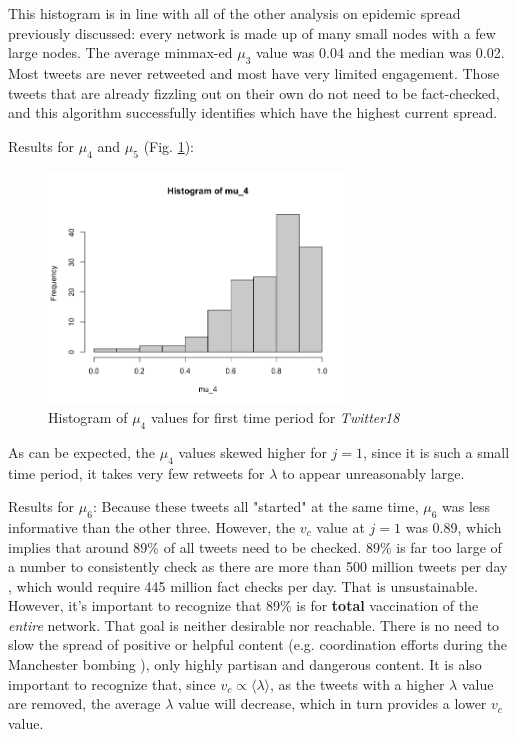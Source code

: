 \documentclass[preprint,review,12pt]{elsarticle}
\begin{document}
This histogram is in line with all of the other analysis on epidemic spread previously discussed: every network is made up of many small nodes with a few large nodes. The average minmax-ed $\mu_3$ value was 0.04 and the median was 0.02. Most tweets are never retweeted and most have very limited engagement. Those tweets that are already fizzling out on their own do not need to be fact-checked, and this algorithm successfully identifies which have the highest current spread. 

Results for $\mu_4$ and $\mu_5$ (Fig. \ref{fig:Hist mu_4 Twitter18}):
\begin{figure}[h!]
    \centering
    \includegraphics[width=8cm]{histogram of mu_4.png}
    \caption{Histogram of $\mu_4$ values for first time period for \textit{Twitter18}}
    \label{fig:Hist mu_4 Twitter18}
\end{figure}
As can be expected, the $\mu_4$ values skewed higher for $j=1$, since it is such a small time period, it takes very few retweets for $\lambda$ to appear unreasonably large.  

Results for $\mu_6$:
Because these tweets all "started" at the same time, $\mu_6$ was less informative than the other three. However, the $v_c$ value at $j=1$ was 0.89, which implies that around 89\% of all tweets need to be checked. 89\% is far too large of a number to consistently check as there are more than 500 million tweets per day \cite{raffi2013tweets}, which would require 445 million fact checks per day. That is unsustainable. However, it's important to recognize that 89\% is for \textbf{total} vaccination of the \textit{entire} network. That goal is neither desirable nor reachable. There is no need to slow the spread of positive or helpful content (e.g. coordination efforts during the Manchester bombing \cite{mirbabaie2020breaking, eriksson2016facebook}), only highly partisan and dangerous content. It is also important to recognize that, since $v_c \propto \langle \lambda \rangle$, as the tweets with a higher $\lambda$ value are removed, the average $\lambda$ value will decrease, which in turn provides a lower $v_c$ value.
\end{document}
